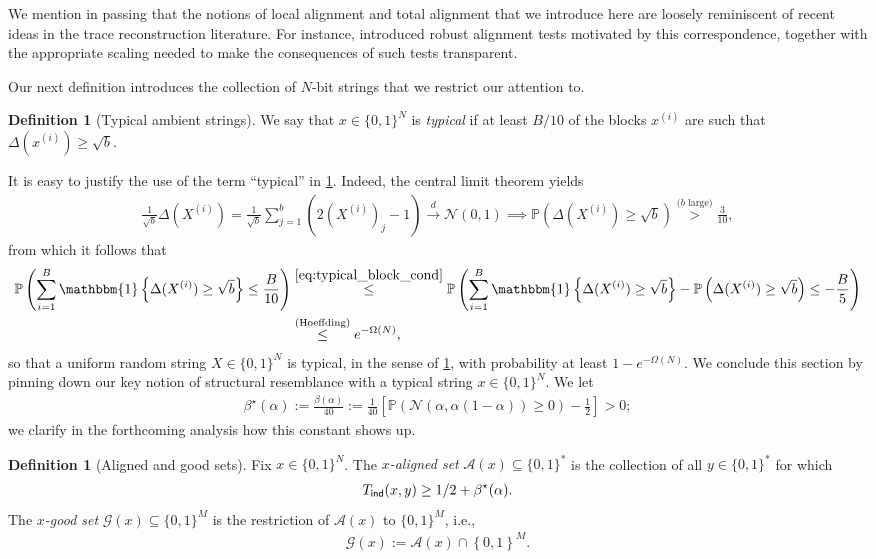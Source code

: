 \documentclass[11pt]{amsart}
\numberwithin{equation}{section}
\numberwithin{equation}{section}
\newcommand{\1}{\mathbbm{1}}
\newcommand{\Prob}{\mathbb{P}}
\newcommand{\ind}{\textup{\textsf{ind}}}
\theoremstyle{definition}
\newtheorem{definition}[theorem]{Definition}
\begin{document}
We mention in passing that the notions of local alignment and total alignment that we introduce here are loosely reminiscent of recent ideas in the trace reconstruction literature. For instance, \cite{holden2018subpolynomial} introduced robust alignment tests motivated by this correspondence, together with the appropriate scaling needed to make the consequences of such tests transparent.

Our next definition introduces the collection of $N$-bit strings that we restrict our attention to.
\begin{definition}[Typical ambient strings] \label{defn:typical_W}
    We say that $x \in \{0,1\}^{N}$ is \emph{typical} if at least $B/10$ of the blocks $x^{(i)}$ are such that $\Delta(x^{(i)}) \geq \sqrt{b}$.
\end{definition}
It is easy to justify the use of the term ``typical'' in \cref{defn:typical_W}. Indeed, the central limit theorem yields
\begin{align} \label{eq:typical_block_cond}
    \frac{1}{\sqrt{b}} \Delta(X^{(i)}) = \frac{1}{\sqrt{b}} \sum_{j=1}^{b} \left( 2( X^{(i)} )_j - 1 \right) \xrightarrow{d} \mathcal N(0,1) \implies \Prob\left( \Delta(X^{(i)}) \geq \sqrt{b} \right) \stackrel{\text{($b$ large)}}{>} \frac{3}{10},
\end{align}
from which it follows that
\begin{align*}
    \Prob\left( \sum_{i=1}^B \1\left\{ \Delta(X^{(i)}) \geq \sqrt{b} \right\} \leq \frac{B}{10} \right) & \stackrel{\eqref{eq:typical_block_cond}}{\leq} \Prob\left( \sum_{i=1}^B \1\left\{ \Delta(X^{(i)}) \geq \sqrt{b} \right\} - \Prob\left( \Delta(X^{(i)}) \geq \sqrt{b} \right) \leq -\frac{B}{5} \right) \\
    & \stackrel{\text{(Hoeffding)}}{\leq} e^{-\Omega(N)},
\end{align*}
so that a uniform random string $X \in \{0,1\}^N$ is typical, in the sense of \cref{defn:typical_W}, with probability at least $1 - e^{-\Omega(N)}$. We conclude this section by pinning down our key notion of structural resemblance with a typical string $x \in \{0,1\}^N$. We let 
\begin{align} \label{eq:alignment_constant}
    \beta^\star(\alpha) := \frac{\beta(\alpha)}{40} := \frac{1}{40} \left[ \Prob\left( \mathcal N\left( \alpha, \alpha\left( 1 - \alpha \right) \right) \geq 0 \right) - \frac{1}{2} \right] > 0;
\end{align}
we clarify in the forthcoming analysis how this constant shows up.
\begin{definition}[Aligned and good sets]
    Fix $x \in \{0,1\}^{N}$. The \emph{$x$-aligned set} $\mathcal A(x) \subseteq \{0, 1\}^*$ is the collection of all $y \in \{0,1\}^*$ for which 
    \begin{align*}
        T_\ind(x, y) \geq 1/2 + \beta^\star(\alpha).
    \end{align*}
    The \emph{$x$-good set} $\mathcal G(x) \subseteq \{0,1\}^M$ is the restriction of $\mathcal A(x)$ to $\{0,1\}^M$, i.e.,
    \begin{align} \label{eq:good_set_defn}
        \mathcal G(x) := \mathcal A(x) \cap \left\{ 0,1 \right\}^M.
    \end{align}
\end{definition}
\end{document}
